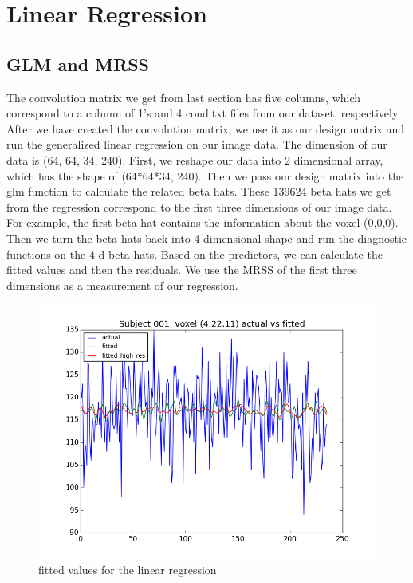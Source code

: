\section{Linear Regression}
\subsection{GLM and MRSS}
\noindent
The convolution matrix we get from last section has five columns, which correspond to a column of 1's and 4 cond.txt files from our dataset, respectively. After we have created the convolution matrix, we use it as our design matrix and run the generalized linear regression on our image data. The dimension of our data is (64, 64, 34, 240). First, we reshape our data into 2 dimensional array, which has the shape of (64*64*34, 240). Then we pass our design matrix into the glm function to calculate the related beta hats. These 139624 beta hats we get from the regression correspond to the first three dimensions of our image data. For example, the first beta hat contains the information about the voxel (0,0,0). Then we turn the beta hats back into 4-dimensional shape and run the diagnostic functions on the 4-d beta hats. Based on the predictors, we can calculate the fitted values and then the residuals. We use the MRSS of the first three dimensions as a measurement of our regression. \newline

\begin{figure}[H]
    \centering
        \includegraphics[scale=0.5]{../plots/glm_fitted.png}
    \caption{fitted values for the linear regression}
\end{figure}


